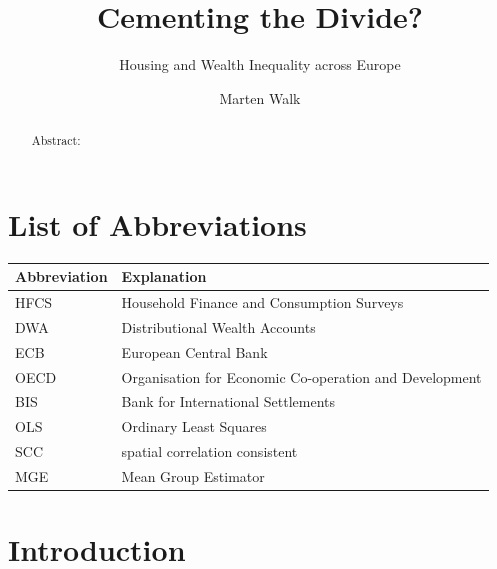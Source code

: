 \documentclass[
  a4paper,
  DIV=11,
  numbers=noendperiod]{scrartcl}
\title{Cementing the Divide?}
\subtitle{Housing and Wealth Inequality across Europe}
\author{Marten Walk}
\date{}
\begin{document}
\maketitle
\begin{abstract}
Abstract:
\end{abstract}



\newpage{}

\tableofcontents

\newpage{}

\listoffigures

\listoftables

\section*{List of Abbreviations}\label{list-of-abbreviations}

\begin{longtable}[]{@{}
  >{\raggedright\arraybackslash}p{}
  >{\raggedright\arraybackslash}p{}@{}}
\toprule\noalign{}
\begin{minipage}[b]{\linewidth}\raggedright
Abbreviation
\end{minipage} & \begin{minipage}[b]{\linewidth}\raggedright
Explanation
\end{minipage} \\
\midrule\noalign{}
\endhead
\bottomrule\noalign{}
\endlastfoot
HFCS & Household Finance and Consumption Surveys \\
DWA & Distributional Wealth Accounts \\
ECB & European Central Bank \\
OECD & Organisation for Economic Co-operation and Development \\
BIS & Bank for International Settlements \\
OLS & Ordinary Least Squares \\
SCC & spatial correlation consistent \\
MGE & Mean Group Estimator \\
\end{longtable}

\newpage{}


\newpage{}

\section{Introduction}\label{introduction}
\end{document}
